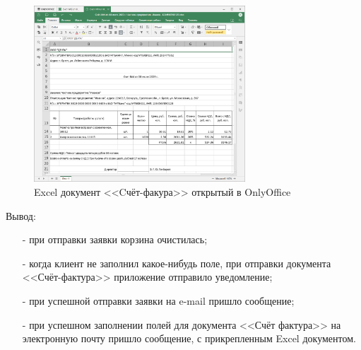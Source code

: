 \begin{figure}[!htb]\centering

    \includegraphics[height=6.6cm]
    {images/mobile/order/order-email-4.png}

    \caption{Excel документ <<Cчёт-факура>> открытый в OnlyOffice}
    \label{fig:test_order_excel}
\end{figure}

Вывод:

\begin{itemize}
    \item[-] при отправки заявки корзина очистилась;
    \item[-] когда клиент не заполнил какое-нибудь поле, при отправки документа <<Счёт-фактура>>
    приложение отправило уведомление;
    \item[-] при успешной отправки заявки на e-mail пришло сообщение;
    \item[-] при успешном заполнении полей для документа <<Счёт фактура>> на электронную почту пришло сообщение,
    с прикрепленным Excel документом.
\end{itemize}
